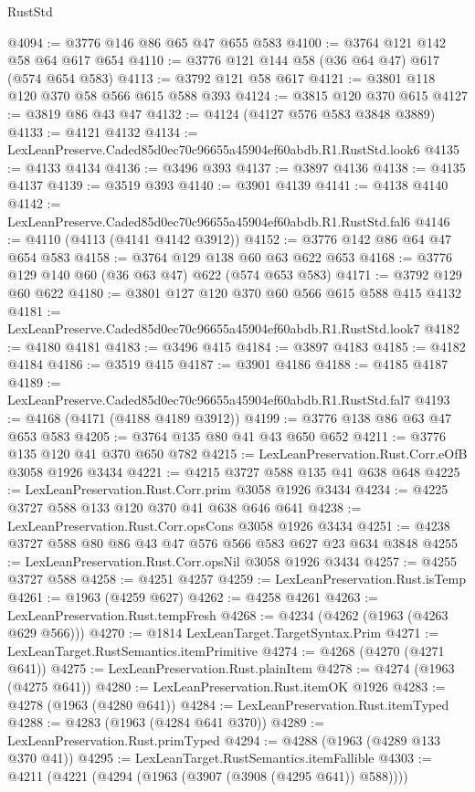 \begin{lexlean}{RustStd}
\begin{coremodule}
@4094 := @3776 @146 @86 @65 @47 @655 @583
@4100 := @3764 @121 @142 @58 @64 @617 @654
@4110 := @3776 @121 @144 @58 (@36 @64 @47) @617 (@574 @654 @583)
@4113 := @3792 @121 @58 @617
@4121 := @3801 @118 @120 @370 @58 @566 @615 @588 @393
@4124 := @3815 @120 @370 @615
@4127 := @3819 @86 @43 @47
@4132 := @4124 (@4127 @576 @583 @3848 @3889)
@4133 := @4121 @4132
@4134 := LexLeanPreserve.Caded85d0ec70c96655a45904ef60abdb.R1.RustStd.look6
@4135 := @4133 @4134
@4136 := @3496 @393
@4137 := @3897 @4136
@4138 := @4135 @4137
@4139 := @3519 @393
@4140 := @3901 @4139
@4141 := @4138 @4140
@4142 := LexLeanPreserve.Caded85d0ec70c96655a45904ef60abdb.R1.RustStd.fal6
@4146 := @4110 (@4113 (@4141 @4142 @3912))
@4152 := @3776 @142 @86 @64 @47 @654 @583
@4158 := @3764 @129 @138 @60 @63 @622 @653
@4168 := @3776 @129 @140 @60 (@36 @63 @47) @622 (@574 @653 @583)
@4171 := @3792 @129 @60 @622
@4180 := @3801 @127 @120 @370 @60 @566 @615 @588 @415 @4132
@4181 := LexLeanPreserve.Caded85d0ec70c96655a45904ef60abdb.R1.RustStd.look7
@4182 := @4180 @4181
@4183 := @3496 @415
@4184 := @3897 @4183
@4185 := @4182 @4184
@4186 := @3519 @415
@4187 := @3901 @4186
@4188 := @4185 @4187
@4189 := LexLeanPreserve.Caded85d0ec70c96655a45904ef60abdb.R1.RustStd.fal7
@4193 := @4168 (@4171 (@4188 @4189 @3912))
@4199 := @3776 @138 @86 @63 @47 @653 @583
@4205 := @3764 @135 @80 @41 @43 @650 @652
@4211 := @3776 @135 @120 @41 @370 @650 @782
@4215 := LexLeanPreservation.Rust.Corr.eOfB @3058 @1926 @3434
@4221 := @4215 @3727 @588 @135 @41 @638 @648
@4225 := LexLeanPreservation.Rust.Corr.prim @3058 @1926 @3434
@4234 := @4225 @3727 @588 @133 @120 @370 @41 @638 @646 @641
@4238 := LexLeanPreservation.Rust.Corr.opsCons @3058 @1926 @3434
@4251 := @4238 @3727 @588 @80 @86 @43 @47 @576 @566 @583 @627 @23 @634 @3848
@4255 := LexLeanPreservation.Rust.Corr.opsNil @3058 @1926 @3434
@4257 := @4255 @3727 @588
@4258 := @4251 @4257
@4259 := LexLeanPreservation.Rust.isTemp
@4261 := @1963 (@4259 @627)
@4262 := @4258 @4261
@4263 := LexLeanPreservation.Rust.tempFresh
@4268 := @4234 (@4262 (@1963 (@4263 @629 @566)))
@4270 := @1814 LexLeanTarget.TargetSyntax.Prim
@4271 := LexLeanTarget.RustSemantics.itemPrimitive
@4274 := @4268 (@4270 (@4271 @641))
@4275 := LexLeanPreservation.Rust.plainItem
@4278 := @4274 (@1963 (@4275 @641))
@4280 := LexLeanPreservation.Rust.itemOK @1926
@4283 := @4278 (@1963 (@4280 @641))
@4284 := LexLeanPreservation.Rust.itemTyped
@4288 := @4283 (@1963 (@4284 @641 @370))
@4289 := LexLeanPreservation.Rust.primTyped
@4294 := @4288 (@1963 (@4289 @133 @370 @41))
@4295 := LexLeanTarget.RustSemantics.itemFallible
@4303 := @4211 (@4221 (@4294 (@1963 (@3907 (@3908 (@4295 @641)) @588))))

\end{coremodule}
\end{lexlean}
